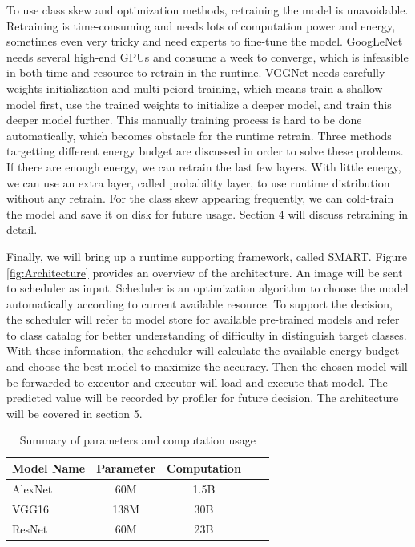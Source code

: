 \documentclass{article}
\begin{document}
To use class skew and optimization methods, retraining the model is unavoidable. Retraining is time-consuming and needs lots of computation power and energy, sometimes even very tricky and need experts to fine-tune the model. GoogLeNet \cite{szegedy2015going} needs several high-end GPUs and consume a week to converge, which is infeasible in both time and resource to retrain in the runtime. VGGNet \cite{simonyan2014very} needs carefully weights initialization and multi-peiord training, which means train a shallow model first, use the trained weights to initialize a deeper model, and train this deeper model further. This manually training process is hard to be done automatically, which becomes obstacle for the runtime retrain. Three methods targetting different energy budget are discussed in order to solve these problems. If there are enough energy, we can retrain the last few layers. With little energy, we can use an extra layer, called probability layer, to use runtime distribution without any retrain. For the class skew appearing frequently, we can cold-train the model and save it on disk for future usage. Section 4 will discuss retraining in detail.

Finally, we will bring up a runtime supporting framework, called SMART. Figure \ref{fig:Architecture} provides an overview of the architecture. An image will be sent to scheduler as input. Scheduler is an optimization algorithm to choose the model automatically according to current available resource. To support the decision, the scheduler will refer to model store for available pre-trained models and refer to class catalog for better understanding of difficulty in distinguish target classes. With these information, the scheduler will calculate the available energy budget and choose the best model to maximize the accuracy. Then the chosen model will be forwarded to executor and executor will load and execute that model. The predicted value will be recorded by profiler for future decision. The architecture will be covered in section 5.

\begin{table}[!th]
    \centering
    \begin{tabular}{|l|c|c|c|c|}
        \hline
        \multicolumn{1}{|c|}{Model Name} & Parameter& Computation \\
        \hline
        AlexNet &  60M & 1.5B \\
        VGG16   & 138M &  30B \\
        ResNet  &  60M &  23B \\
        \hline
    \end{tabular}
    \vspace{1em}
    \caption{Summary of parameters and computation usage}
    \label{tab:compare}
\end{table}
\end{document}
